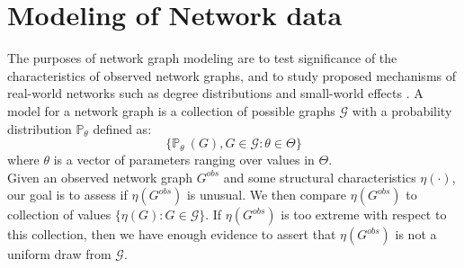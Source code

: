 \section{Modeling of Network data}
\label{sec:back_model}
The purposes of network graph modeling are to test significance of the characteristics of observed network graphs, and to study proposed mechanisms of real-world networks such as degree distributions and small-world effects \cite{kolaczyk_statistical_2014}. A model for a network graph is a collection of possible graphs $\mathscr{G}$ with a probability distribution $\mathbb{P}_\theta$ defined as:
\begin{equation} 
\{ \mathbb{P}_\theta\ (G), G \in \mathscr{G} : \theta \in \Theta \} 
\end{equation}
where $\theta$ is a vector of parameters ranging over values in $\Theta$.\\
Given an observed network graph $G^{obs}$ and some structural characteristics $\eta (\cdot)$, our goal is to assess if $\eta (G^{obs})$ is unusual. We then compare $\eta (G^{obs})$ to collection of values $\{\eta(G):G \in \mathscr{G}\}$. If $\eta (G^{obs})$ is too extreme with respect to this collection, then we have enough evidence to assert that $\eta (G^{obs})$ is not a uniform draw from $\mathscr{G}$. %

